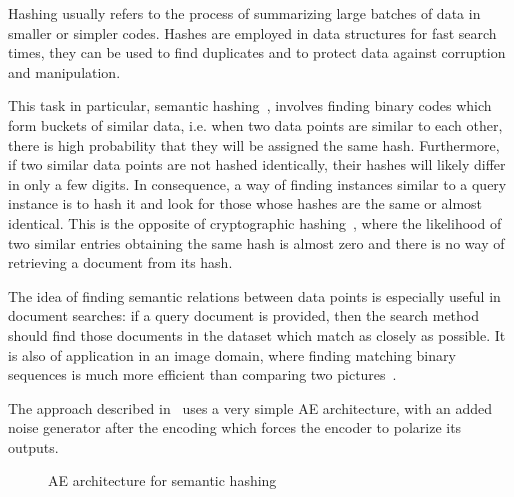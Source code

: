 Hashing usually refers to the process of summarizing large batches of data in smaller or simpler codes. Hashes are employed in data structures for fast search times, they can be used to find duplicates and to protect data against corruption and manipulation.

This task in particular, semantic hashing~\cite{salakhutdinov}, involves finding binary codes which form buckets of similar data, i.e. when two data points are similar to each other, there is high probability that they will be assigned the same hash. Furthermore, if two similar data points are not hashed identically, their hashes will likely differ in only a few digits. In consequence, a way of finding instances similar to a query instance is to hash it and look for those whose hashes are the same or almost identical. This is the opposite of cryptographic hashing~\cite{katz2014introduction}, where the likelihood of two similar entries obtaining the same hash is almost zero and there is no way of retrieving a document from its hash.

The idea of finding semantic relations between data points is especially useful in document searches: if a query document is provided, then the search method should find those documents in the dataset which match as closely as possible. It is also of application in an image domain, where finding matching binary sequences is much more efficient than comparing two pictures~\cite{carreira2015}.

The approach described in~\cite{salakhutdinov} uses a very simple AE architecture, with an added noise generator after the encoding which forces the encoder to polarize its outputs. 



\begin{figure}[ht]
    \centering\small
    \caption{AE architecture for semantic hashing}
    \label{p5fig:semantic}
\end{figure}

